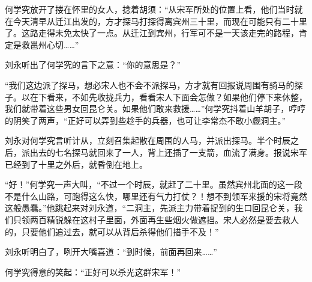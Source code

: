 何学究放开了搂在怀里的女人，捻着胡须：“从宋军所处的位置上看，他们当时就在今天清早从迁江出发的，方才探马打探得离宾州三十里，而现在可能只有二十里了。这路走得未免太快了一点。从迁江到宾州，行军可不是一天该走完的路程，肯定是救邕州心切……”

刘永听出了何学究的言下之意：“你的意思是？”

“我们这边派了探马，想必宋人也不会不派探马，方才就有回报说周围有骑马的探子。以在下看来，不如先收拢兵力，看看宋人下面会怎做？如果他们停下来休整，我们就带着这些男女回昆仑关。如果他们敢来救援……”何学究抖着山羊胡子，哼哼的阴笑了两声，“正好可以弄到些趁手的兵器，也可让李常杰不敢小觑洞主。”

刘永对何学究言听计从，立刻召集起散在周围的人马，并派出探马。半个时辰之后，派出去的七名探马就回来了一人，背上还插了一支箭，血流了满身。报说宋军已经到了十里之外后，就昏倒在地上。

“好！”何学究一声大叫，“不过一个时辰，就赶了二十里。虽然宾州北面的这一段不是什么山路，可跑得这么快，哪里还有气力打仗？！想不到领军来援的宋将竟然这般愚蠢。”他跳起来对刘永道，“二洞主，先派主力带着捉到的生口回昆仑关，我们只领两百精锐躲在这村子里面，外面再生些烟火做遮挡。宋人必然是要去救人的，只要他们追过去，就可以从背后杀得他们措手不及！”

刘永听明白了，咧开大嘴喜道：“到时候，前面再回来……”

何学究得意的笑起：“正好可以杀光这群宋军！”

